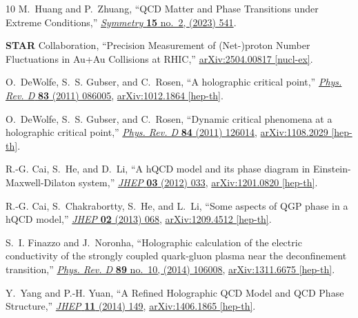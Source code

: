 \documentclass[a4paper,12pt]{article}
\numberwithin{equation}{section}
\begin{document}
\begin{thebibliography}{10}
	M.~Huang and P.~Zhuang, ``{QCD Matter and Phase Transitions under Extreme
		Conditions},'' \href{http://dx.doi.org/10.3390/sym15020541}{{\em Symmetry}
		{\bfseries 15} no.~2, (2023) 541}.
	
	{\bfseries STAR} Collaboration, ``{Precision Measurement of (Net-)proton Number
		Fluctuations in Au+Au Collisions at RHIC},''
	\href{http://arxiv.org/abs/2504.00817}{{\ttfamily arXiv:2504.00817
			[nucl-ex]}}.
	
	O.~DeWolfe, S.~S. Gubser, and C.~Rosen, ``{A holographic critical point},''
	\href{http://dx.doi.org/10.1103/PhysRevD.83.086005}{{\em Phys. Rev. D}
		{\bfseries 83} (2011) 086005},
	\href{http://arxiv.org/abs/1012.1864}{{\ttfamily arXiv:1012.1864 [hep-th]}}.
	
	O.~DeWolfe, S.~S. Gubser, and C.~Rosen, ``{Dynamic critical phenomena at a
		holographic critical point},''
	\href{http://dx.doi.org/10.1103/PhysRevD.84.126014}{{\em Phys. Rev. D}
		{\bfseries 84} (2011) 126014},
	\href{http://arxiv.org/abs/1108.2029}{{\ttfamily arXiv:1108.2029 [hep-th]}}.
	
	R.-G. Cai, S.~He, and D.~Li, ``{A hQCD model and its phase diagram in
		Einstein-Maxwell-Dilaton system},''
	\href{http://dx.doi.org/10.1007/JHEP03(2012)033}{{\em JHEP} {\bfseries 03}
		(2012) 033}, \href{http://arxiv.org/abs/1201.0820}{{\ttfamily arXiv:1201.0820
			[hep-th]}}.
	
	R.-G. Cai, S.~Chakrabortty, S.~He, and L.~Li, ``{Some aspects of QGP phase in a
		hQCD model},'' \href{http://dx.doi.org/10.1007/JHEP02(2013)068}{{\em JHEP}
		{\bfseries 02} (2013) 068}, \href{http://arxiv.org/abs/1209.4512}{{\ttfamily
			arXiv:1209.4512 [hep-th]}}.
	
	S.~I. Finazzo and J.~Noronha, ``{Holographic calculation of the electric
		conductivity of the strongly coupled quark-gluon plasma near the
		deconfinement transition},''
	\href{http://dx.doi.org/10.1103/PhysRevD.89.106008}{{\em Phys. Rev. D}
		{\bfseries 89} no.~10, (2014) 106008},
	\href{http://arxiv.org/abs/1311.6675}{{\ttfamily arXiv:1311.6675 [hep-th]}}.
	
	Y.~Yang and P.-H. Yuan, ``{A Refined Holographic QCD Model and QCD Phase
		Structure},'' \href{http://dx.doi.org/10.1007/JHEP11(2014)149}{{\em JHEP}
		{\bfseries 11} (2014) 149}, \href{http://arxiv.org/abs/1406.1865}{{\ttfamily
			arXiv:1406.1865 [hep-th]}}.
	

\end{thebibliography}
\end{document}
